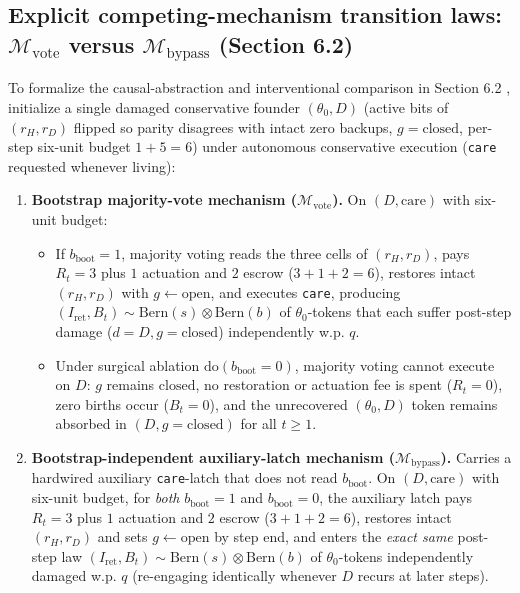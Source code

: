 \documentclass[11pt,letterpaper]{article}
\providecommand{\tightlist}{\setlength{\itemsep}{2pt}\setlength{\parskip}{0pt}}
\begin{document}
\subsection{\texorpdfstring{Explicit competing-mechanism transition
laws: \(\mathcal{M}_{\mathrm{vote}}\) versus
\(\mathcal{M}_{\mathrm{bypass}}\) (Section
6.2)}{Explicit competing-mechanism transition laws: \textbackslash mathcal\{M\}\_\{\textbackslash mathrm\{vote\}\} versus \textbackslash mathcal\{M\}\_\{\textbackslash mathrm\{bypass\}\} (Section 6.2)}}\label{explicit-competing-mechanism-transition-laws-mathcalm_mathrmvote-versus-mathcalm_mathrmbypass-section-6.2}

To formalize the causal-abstraction and interventional comparison in
Section 6.2 \citep{rubenstein2017}, initialize a single damaged
conservative founder \((\theta_0, D)\) (active bits of \((r_H, r_D)\)
flipped so parity disagrees with intact zero backups,
\(g = \mathrm{closed}\), per-step six-unit budget \(1 + 5 = 6\)) under
autonomous conservative execution (\texttt{care} requested whenever
living):

\begin{enumerate}
\def\labelenumi{\arabic{enumi}.}
\tightlist
\item
  \textbf{Bootstrap majority-vote mechanism
  (\(\mathcal{M}_{\mathrm{vote}}\)).} On \((D, \mathrm{care})\) with
  six-unit budget:

  \begin{itemize}
  \tightlist
  \item
    If \(b_{\mathrm{boot}} = 1\), majority voting reads the three cells
    of \((r_H, r_D)\), pays \(R_t = 3\) plus \(1\) actuation and \(2\)
    escrow (\(3+1+2=6\)), restores intact \((r_H, r_D)\) with
    \(g \leftarrow \mathrm{open}\), and executes \texttt{care},
    producing
    \((I_{\mathrm{ret}}, B_t) \sim \mathrm{Bern}(s)\otimes\mathrm{Bern}(b)\)
    of \(\theta_0\)-tokens that each suffer post-step damage
    (\(d = D, g = \mathrm{closed}\)) independently w.p. \(q\).
  \item
    Under surgical ablation \(\mathrm{do}(b_{\mathrm{boot}} = 0)\),
    majority voting cannot execute on \(D\): \(g\) remains
    \(\mathrm{closed}\), no restoration or actuation fee is spent
    (\(R_t = 0\)), zero births occur (\(B_t = 0\)), and the unrecovered
    \((\theta_0, D)\) token remains absorbed in
    \((D, g=\mathrm{closed})\) for all \(t \ge 1\).
  \end{itemize}
\item
  \textbf{Bootstrap-independent auxiliary-latch mechanism
  (\(\mathcal{M}_{\mathrm{bypass}}\)).} Carries a hardwired auxiliary
  \texttt{care}-latch that does not read \(b_{\mathrm{boot}}\). On
  \((D, \mathrm{care})\) with six-unit budget, for \emph{both}
  \(b_{\mathrm{boot}} = 1\) and \(b_{\mathrm{boot}} = 0\), the auxiliary
  latch pays \(R_t = 3\) plus \(1\) actuation and \(2\) escrow
  (\(3+1+2=6\)), restores intact \((r_H, r_D)\) and sets
  \(g \leftarrow \mathrm{open}\) by step end, and enters the \emph{exact
  same} post-step law
  \((I_{\mathrm{ret}}, B_t) \sim \mathrm{Bern}(s)\otimes\mathrm{Bern}(b)\)
  of \(\theta_0\)-tokens independently damaged w.p. \(q\) (re-engaging
  identically whenever \(D\) recurs at later steps).
\end{enumerate}
\end{document}
